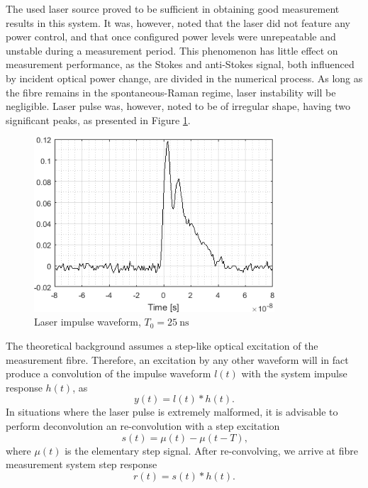 \documentclass{standalone}
\begin{document}
The used laser source proved to be sufficient in obtaining good measurement results in this system. It was, however, noted that the laser did not feature any power control, and that once configured power levels were unrepeatable and unstable during a measurement period. This phenomenon has little effect on measurement performance, as the Stokes and anti-Stokes signal, both influenced by incident optical power change, are divided in the numerical process. As long as the fibre remains in the spontaneous-Raman regime, laser instability will be negligible. Laser pulse was, however, noted to be of irregular shape, having two significant peaks, as presented in Figure \ref{fig:laser_waveform}.
\begin{figure}[h]
	\centering
	\includegraphics[width=0.8\textwidth]{laser_waveform.png}
	\caption{Laser impulse waveform, $T_0 = \SI{25}{\nano \second}$}
	\label{fig:laser_waveform}
\end{figure}
The theoretical background assumes a step-like optical excitation of the measurement fibre. Therefore, an excitation by any other waveform will in fact produce a convolution of the impulse waveform $l(t)$ with the system impulse response $h(t)$, as
\begin{equation}
y(t) = l(t) \ast h(t) \textrm{.}
\end{equation}
In situations where the laser pulse is extremely malformed, it is advisable to perform deconvolution an re-convolution with a step excitation
\begin{equation}
s(t) = \mu(t) - \mu(t-T) \textrm{,}
\end{equation}
where $\mu(t)$ is the elementary step signal. After re-convolving, we arrive at fibre measurement system step response
\begin{equation}
r(t) = s(t) \ast h(t) \textrm{.}
\end{equation}
\end{document}
